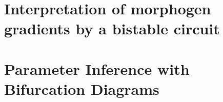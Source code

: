 \appendix

\chapter{Interpretation of morphogen gradients by a bistable circuit}
\label{appendix:double-exclusive}


\chapter{Parameter Inference with Bifurcation Diagrams}
\label{appendix:inference}

